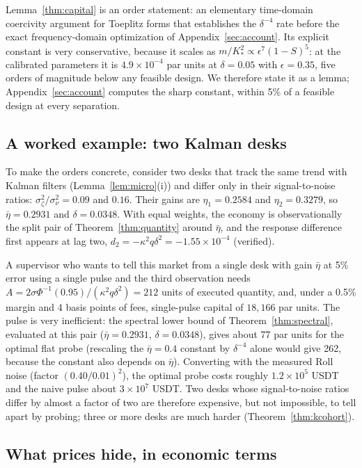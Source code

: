 \documentclass[12pt]{article}
\theoremstyle{definition}
\theoremstyle{remark}
\begin{document}
Lemma~\ref{thm:capital} is an order statement: an elementary time-domain coercivity argument for Toeplitz forms that establishes the $\delta^{-4}$ rate before the exact frequency-domain optimization of Appendix~\ref{sec:account}. Its explicit constant is very conservative, because it scales as $m/K_*^2\propto\epsilon^7(1-S)^5$: at the calibrated parameters it is $4.9\times10^{-4}$ par units at $\delta=0.05$ with $\epsilon=0.35$, five orders of magnitude below any feasible design. We therefore state it as a lemma; Appendix~\ref{sec:account} computes the sharp constant, within 5\% of a feasible design at every separation.

\subsection{A worked example: two Kalman desks}\label{sec:worked}

To make the orders concrete, consider two desks that track the same trend with Kalman filters (Lemma~\ref{lem:micro}(i)) and differ only in their signal-to-noise ratios: $\sigma_\zeta^2/\sigma_\nu^2=0.09$ and $0.16$. Their gains are $\eta_1=0.2584$ and $\eta_2=0.3279$, so $\bar\eta=0.2931$ and $\delta=0.0348$. With equal weights, the economy is observationally the split pair of Theorem~\ref{thm:quantity} around $\bar\eta$, and the response difference first appears at lag two, $d_2=-\kappa^2q\delta^2=-1.55\times10^{-4}$ (verified).

A supervisor who wants to tell this market from a single desk with gain $\bar\eta$ at 5\% error using a single pulse and the third observation needs $A=2\sigma\Phi^{-1}(0.95)/(\kappa^2q\delta^2)=212$ units of executed quantity, and, under a 0.5\% margin and 4 basis points of fees, single-pulse capital of $18{,}166$ par units. The pulse is very inefficient: the spectral lower bound of Theorem~\ref{thm:spectral}, evaluated at this pair ($\bar\eta=0.2931$, $\delta=0.0348$), gives about 77 par units for the optimal flat probe (rescaling the $\bar\eta=0.4$ constant by $\delta^{-4}$ alone would give 262, because the constant also depends on $\bar\eta$). Converting with the measured Roll noise (factor $(0.40/0.01)^2$), the optimal probe costs roughly $1.2\times10^5$ USDT and the naive pulse about $3\times10^7$ USDT. Two desks whose signal-to-noise ratios differ by almost a factor of two are therefore expensive, but not impossible, to tell apart by probing; three or more desks are much harder (Theorem~\ref{thm:kcohort}).

\subsection{What prices hide, in economic terms}\label{sec:primitives}
\end{document}

